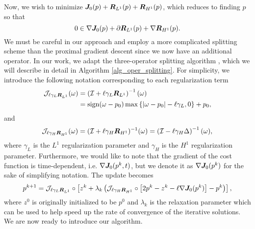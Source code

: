 Now, we wish to minimize $\bm{J}_0(p) + \bm{R}_{L^1}(p) + \bm{R}_{H^1}(p)$, which reduces to finding $p$ so that
\begin{equation}
    0 \in \nabla \bm{J}_0 (p) + \partial \bm{R}_{L^1}(p) + \nabla \bm{R}_{H^1}(p).
\end{equation}
We must be careful in our approach and employ a more complicated splitting scheme than the proximal gradient descent since we now have an additional operator. In our work, we adapt the three-operator splitting algorithm \cite{Davis2017AApplications}, which we will describe in detail in Algorithm \ref{alg_oper_splitting}. For simplicity, we introduce the following notation corresponding to each regularization term
\begin{equation}
\begin{split}
    \mathcal{J}_{\ell \gamma_L \bm{R}_{L^1}}(\omega)  
    & = \left(\mathcal{I} + \ell \gamma_L \bm{R}_{L^1}\right)^{-1}(\omega) \\ 
    & = \text{sign}(\omega - p_0)\max\left\{\left|\omega - p_0\right| - \ell\gamma_L, 0\right\} + p_0,
\end{split}
\end{equation}
and
\begin{equation}
    \mathcal{J}_{ \ell \gamma_H \bm{R}_{H^1}}(\omega) 
   = (\mathcal{I} + \ell \gamma_H \bm{R}_{H^1})^{-1}(\omega) = \left(\mathcal{I} - \ell\gamma_H \Delta \right)^{-1}(\omega),
\end{equation}
where $\gamma_L$ is the $L^1$ regularization parameter and $\gamma_H$ is the $H^1$ regularization parameter. Furthermore, we would like to note that the gradient of the cost function is time-dependent, i.e. $\nabla \bm{J}_0(p^k,t)$, but we denote it as $\nabla \bm{J}_0(p^k)$ for the sake of simplifying notation. The update becomes
\begin{equation}
    p^{k+1} = \mathcal{J}_{\ell \gamma_L \bm{R}_{L^1}} \circ \left[z^k + \lambda_k\left(\mathcal{J}_{ \ell \gamma_H \bm{R}_{H^1}} \circ \left[2p^k - z^k - \ell\nabla \bm{J}_0(p^k)\right]-p^k\right)\right],
\end{equation}
where $z^0$ is originally initialized to be $p^0$ and $\lambda_k$ is the relaxation parameter which can be used to help speed up the rate of convergence of the iterative solutions.
We are now ready to introduce our algorithm.

